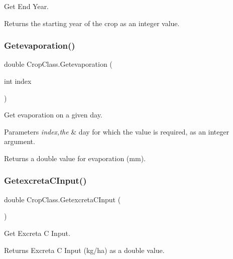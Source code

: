 Get End Year. 

\begin{DoxyReturn}{Returns}
the starting year of the crop as an integer value. 
\end{DoxyReturn}
\mbox{\label{class_crop_class_a9bde6fbfb420275c34f288b872aecd89}} 
\subsubsection{\texorpdfstring{Getevaporation()}{Getevaporation()}}
{\footnotesize\ttfamily double Crop\+Class.\+Getevaporation (\begin{DoxyParamCaption}\item[{int}]{index }\end{DoxyParamCaption})\hspace{0.3cm}{\ttfamily [inline]}}



Get evaporation on a given day. 


\begin{DoxyParams}{Parameters}
{\em index,the} & day for which the value is required, as an integer argument. \\
\hline
\end{DoxyParams}
\begin{DoxyReturn}{Returns}
a double value for evaporation (mm). 
\end{DoxyReturn}
\mbox{\label{class_crop_class_a4459b8aeaed3801ec98f64ffe5faf121}} 
\subsubsection{\texorpdfstring{GetexcretaCInput()}{GetexcretaCInput()}}
{\footnotesize\ttfamily double Crop\+Class.\+Getexcreta\+C\+Input (\begin{DoxyParamCaption}{ }\end{DoxyParamCaption})\hspace{0.3cm}{\ttfamily [inline]}}



Get Excreta C Input. 

\begin{DoxyReturn}{Returns}
Excreta C Input (kg/ha) as a double value. 
\end{DoxyReturn}
\mbox{\label{class_crop_class_acb2d5fbc6a129de60d98ed8fd444a202}} 
